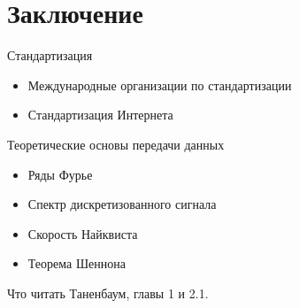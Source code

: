 \documentclass[utf8]{beamer}
\begin{document}
\section{Заключение}
\begin{frame}
\begin{block}{Стандартизация}
\begin{itemize}
 \item Международные организации по стандартизации
 \item Стандартизация Интернета
\end{itemize}
\end{block}
\begin{block}{Теоретические основы передачи данных}
 \begin{itemize}
  \item Ряды Фурье
  \item Спектр дискретизованного сигнала
  \item Скорость Найквиста
  \item Теорема Шеннона
 \end{itemize}
\end{block}
\begin{block}{Что читать}
 Таненбаум, главы 1 и 2.1.
\end{block}


\end{frame}
\end{document}
